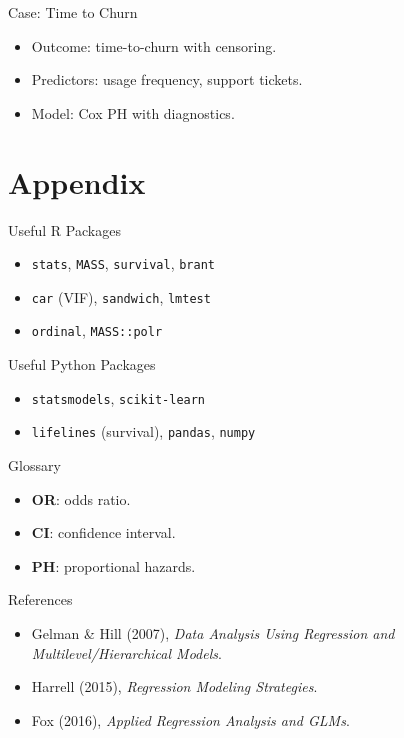 \documentclass[aspectratio=169]{beamer}
\begin{document}
\begin{frame}{Case: Time to Churn}
\begin{itemize}
  \item Outcome: time-to-churn with censoring.
  \item Predictors: usage frequency, support tickets.
  \item Model: Cox PH with diagnostics.
\end{itemize}
\end{frame}

\section{Appendix}

\begin{frame}{Useful R Packages}
\begin{itemize}
  \item \texttt{stats}, \texttt{MASS}, \texttt{survival}, \texttt{brant}
  \item \texttt{car} (VIF), \texttt{sandwich}, \texttt{lmtest}
  \item \texttt{ordinal}, \texttt{MASS::polr}
\end{itemize}
\end{frame}

\begin{frame}{Useful Python Packages}
\begin{itemize}
  \item \texttt{statsmodels}, \texttt{scikit-learn}
  \item \texttt{lifelines} (survival), \texttt{pandas}, \texttt{numpy}
\end{itemize}
\end{frame}

\begin{frame}{Glossary}
\begin{itemize}
  \item \textbf{OR}: odds ratio.
  \item \textbf{CI}: confidence interval.
  \item \textbf{PH}: proportional hazards.
\end{itemize}
\end{frame}

\begin{frame}{References}
\begin{itemize}
  \item Gelman \& Hill (2007), \emph{Data Analysis Using Regression and Multilevel/Hierarchical Models}.
  \item Harrell (2015), \emph{Regression Modeling Strategies}.
  \item Fox (2016), \emph{Applied Regression Analysis and GLMs}.
\end{itemize}
\end{frame}
\end{document}
